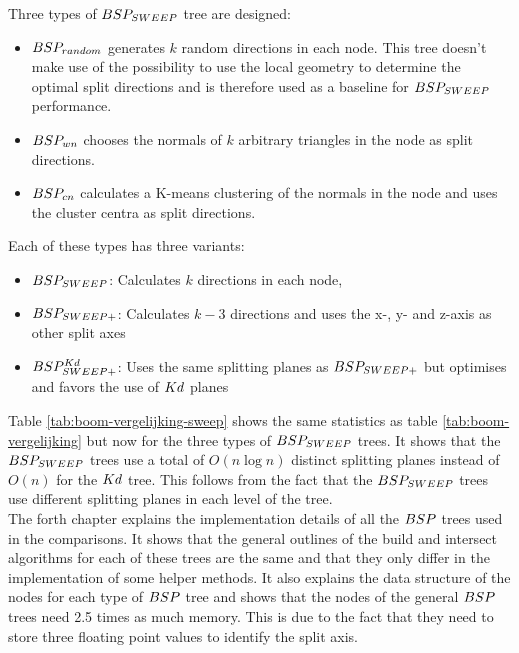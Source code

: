 Three types of $BSP_{SWEEP}$ tree are designed:
\begin{itemize}
  \item $BSP_{random}$ generates $k$ random directions in each node. This tree doesn't make use of the possibility to use the local geometry to determine the optimal split directions and is therefore used as a baseline for $BSP_{SWEEP}$ performance.
  \item $BSP_{wn}$ chooses the normals of $k$ arbitrary triangles in the node as split directions.
  \item $BSP_{cn}$ calculates a K-means clustering of the normals in the node and uses the cluster centra as split directions.
\end{itemize}

Each of these types has three variants:
\begin{itemize}
  \item $BSP_{SWEEP}$: Calculates $k$ directions in each node,
  \item $BSP_{SWEEP+}$: Calculates $k-3$ directions and uses the x-, y- and z-axis as other split axes
  \item $BSP^{Kd}_{SWEEP+}$: Uses the same splitting planes as $BSP_{SWEEP+}$ but optimises and favors the use of $Kd$ planes 
\end{itemize}

Table \ref{tab:boom-vergelijking-sweep} shows the same statistics as table \ref{tab:boom-vergelijking} but now for the three types of $BSP_{SWEEP}$ trees. It shows that the $BSP_{SWEEP}$ trees use a total of $O(n\log n)$ distinct splitting planes instead of $O(n)$ for the $Kd$ tree. This follows from the fact that the $BSP_{SWEEP}$ trees use different splitting planes in each level of the tree.\\

The forth chapter explains the implementation details of all the $BSP$ trees used in the comparisons.
It shows that the general outlines of the build and intersect algorithms for each of these trees are the same and that they only differ in the implementation of some helper methods.
It also explains the data structure of the nodes for each type of $BSP$ tree and shows that the nodes of the general $BSP$ trees need 2.5 times as much memory. This is due to the fact that they need to store three floating point values to identify the split axis.\\

